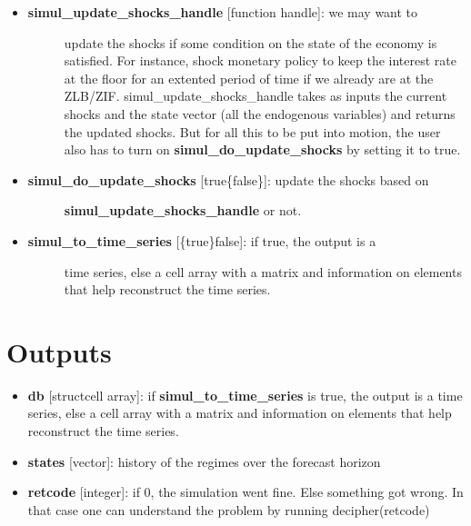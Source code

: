 \documentclass[letterpaper,10pt,english]{sphinxmanual}
\begin{document}
\begin{itemize}
\begin{itemize}
\item {} \begin{description}
\item[{\textbf{simul\_update\_shocks\_handle} {[}function handle{]}: we may want to}] \leavevmode
update the shocks if some condition on the state of the economy is
satisfied. For instance, shock monetary policy to keep the interest
rate at the floor for an extented period of time if we already are
at the ZLB/ZIF. simul\_update\_shocks\_handle takes as inputs the
current shocks and the state vector (all the endogenous variables)
and returns the updated shocks. But for all this to be put into
motion, the user also has to turn on \textbf{simul\_do\_update\_shocks} by
setting it to true.

\end{description}

\item {} \begin{description}
\item[{\textbf{simul\_do\_update\_shocks} {[}true\textbar{}\{false\}{]}: update the shocks based on}] \leavevmode
\textbf{simul\_update\_shocks\_handle} or not.

\end{description}

\item {} \begin{description}
\item[{\textbf{simul\_to\_time\_series} {[}\{true\}\textbar{}false{]}: if true, the output is a}] \leavevmode
time series, else a cell array with a matrix and information on
elements that help reconstruct the time series.

\end{description}

\end{itemize}

\end{itemize}


\section{Outputs}
\label{classes/models/@rfvar/rfvar:id118}\begin{itemize}
\item {} 
\textbf{db} {[}struct\textbar{}cell array{]}: if \textbf{simul\_to\_time\_series} is true, the
output is a time series, else a cell array with a matrix and
information on elements that help reconstruct the time series.

\item {} 
\textbf{states} {[}vector{]}: history of the regimes over the forecast horizon

\item {} 
\textbf{retcode} {[}integer{]}: if 0, the simulation went fine. Else something
got wrong. In that case one can understand the problem by running
decipher(retcode)

\end{itemize}
\end{document}
